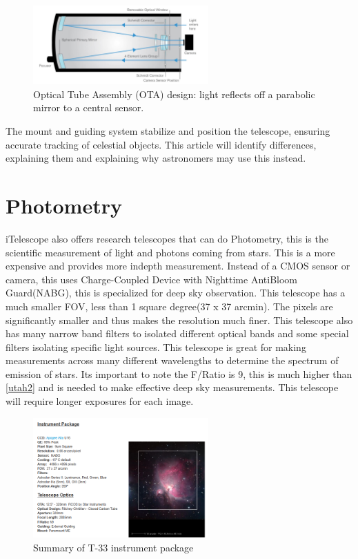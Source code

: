 \documentclass[12pt,oneside,a4paper,english]{article}
\begin{document}
\begin{figure}[H]
    \centering
    \includegraphics[width=0.6\textwidth]{RASA_Diagram.jpg}
    \caption{Optical Tube Assembly (OTA) design: light reflects off a parabolic mirror to a central sensor.\cite{rasa}}
    \label{rasa1}
\end{figure}
The mount and guiding system stabilize and position the telescope, ensuring accurate tracking of celestial objects. This article will identify differences, explaining them and explaining why astronomers may use this instead. 

\section{Photometry}
iTelescope also offers research telescopes that can do Photometry, this is the scientific measurement of light and photons coming from stars. This is a more expensive and provides more indepth measurement. Instead of a CMOS sensor or camera, this uses Charge-Coupled Device with Nighttime AntiBloom Guard(NABG), this is specialized for deep sky observation. This telescope has a much smaller FOV, less than 1 square degree(37 x 37 arcmin). The pixels are significantly smaller and thus makes the resolution much finer. This telescope also has many narrow band filters to isolated different optical bands and some special filters isolating specific light sources. This telescope is great for making measurements across many different wavelengths to determine the spectrum of emission of stars. Its important to note the F/Ratio is 9, this is much higher than \ref{utah2} and is needed to make effective deep sky measurements. This telescope will require longer exposures for each image.

\begin{figure}[H]
    \centering
    \includegraphics[width=0.6\textwidth]{Telescope2.png}
    \caption{Summary of T-33 instrument package\cite{scope2}}
    \label{photo1}
\end{figure}
\end{document}
